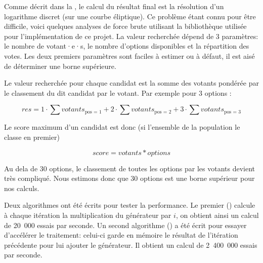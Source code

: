 \documentclass[../report]{subfiles}
\begin{document}
Comme décrit dans la , le calcul du résultat final est la résolution d'un logarithme discret (sur une courbe éliptique).
Ce problème étant connu pour être difficile, voici quelques analyses de force brute utilisant la bibliothèque utilisée
pour l'implémentation de ce projet.
La valeur recherchée dépend de 3 paramètres: le nombre de votant·e·s, le nombre d'options disponibles et la répartition des votes.
Les deux premiers paramètres sont faciles à estimer ou à défaut, il est aisé de déterminer une borne supérieure.

Le valeur recherchée pour chaque candidat est la somme des votants pondérée par le classement du dit candidat par le votant.
Par exemple pour 3 options :

\[
  res = 1 \cdot \sum votants_{\text{pos = 1}}
      + 2 \cdot \sum votants_{\text{pos = 2}}
      + 3 \cdot \sum votants_{\text{pos = 3}}
\]

Le score maximum d'un candidat est donc (si l'ensemble de la population le classe en premier)

\[
  score = votants * options 
\]

Au dela de 30 options, le classement de toutes les options par les votants devient très compliqué.
Nous estimons donc que 30 options est une borne supérieur pour nos calculs.

Deux algorithmes ont été écrits pour tester la performance.
Le premier () calcule à chaque itération la multiplication du générateur 
par $i$, on obtient ainsi un calcul de 20~000 essais par seconde.
Un second algorithme () a été écrit pour essayer d’accélérer le 
traitement: celui-ci garde en mémoire le résultat de l'itération précédente pour lui ajouter le générateur.
Il obtient un calcul de 2~400~000 essais par seconde.
\end{document}
